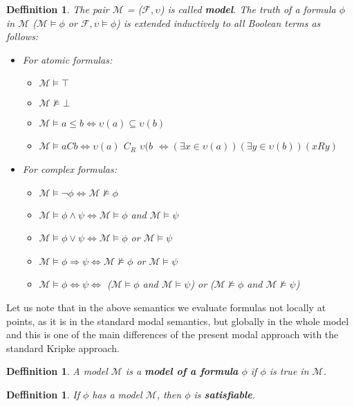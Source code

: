 \documentclass{article}
\newcommand\M{\mathcal{M}}
\newcommand\F{\mathcal{F}}
\newtheorem{defn}[theorem]{Deffinition}
\begin{document}
	\begin{defn}
		The pair $\M$ = ($\F, \upsilon$) is called \textbf{\textit{model}}. The truth of a formula $\phi$ in $\M$ ($\M \models \phi$ or $\F, \upsilon \models \phi$) is extended inductively to all Boolean terms as follows:
		\begin{itemize}
			\item For atomic formulas:
				\begin{itemize}
					\item $\M \models \top$
					\item $\M \not\models \bot$
					\item $\M \models a \leq b \iff \upsilon(a) \subseteq \upsilon(b)$
					\item $\M \models aCb \iff \upsilon(a)$ $C_R$ $\upsilon(b$ $\iff (\exists x \in \upsilon(a))(\exists y \in \upsilon(b))(xRy)$
				\end{itemize}
			\item For complex formulas:
				\begin{itemize}
					\item $\M \models \neg \phi \iff \M \not\models \phi$
					\item $\M \models \phi \land \psi \iff \M \models \phi$ and $\M \models \psi$
					\item $\M \models \phi \lor \psi \iff \M \models \phi$ or $\M \models \psi$
					\item $\M \models \phi \Rightarrow \psi \iff \M \not\models \phi$ or $\M \models \psi$
					\item $\M \models \phi \Leftrightarrow \psi \iff$ ($\M \models \phi$ and $\M \models \psi$) or ($\M \not\models \phi$ and $\M \not\models \psi$)
				\end{itemize}
		\end{itemize}
	\end{defn}
	\par
	Let us note that in the above semantics we evaluate formulas not locally at points, as it is in the standard modal semantics, but globally in the whole model and this is one of the main differences of the present modal approach with the standard Kripke approach.

	\begin{defn}
		A model $\M$ is a \textit{\textbf{model of a formula}} $\phi$ if $\phi$ is \textit{true} in $\M$.
	\end{defn}

	\begin{defn}
		If $\phi$ has a model $\M$, then $\phi$ is \textbf{satisfiable}.
	\end{defn}
\end{document}
